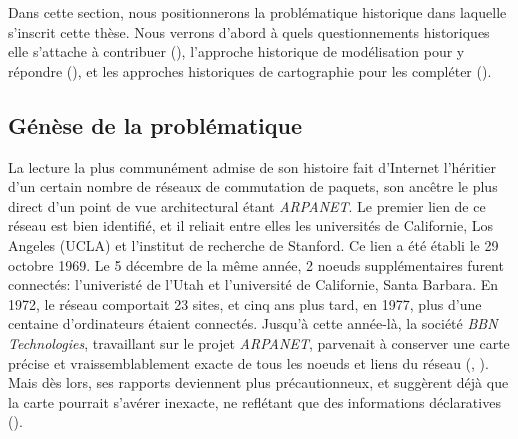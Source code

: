 Dans cette section, nous positionnerons la problématique historique dans
laquelle s'inscrit cette thèse. Nous verrons d'abord à quels questionnements
historiques elle s'attache à contribuer (), l'approche
historique de modélisation pour y répondre (), et les
approches historiques de cartographie pour les compléter
().

\subsection{Génèse de la problématique}
\label{subsec:intro-genesis}

La lecture la plus communément admise de son histoire fait d'Internet l'héritier
d'un certain nombre de réseaux de commutation de paquets, son ancêtre le plus
direct d'un point de vue architectural étant {\em ARPANET}. Le premier lien de
ce réseau est bien identifié, et il reliait entre elles les universités de
Californie, Los Angeles (UCLA) et l'institut de recherche de Stanford. Ce lien a
été établi le 29 octobre 1969. Le 5 décembre de la même année, 2 noeuds
supplémentaires furent connectés: l'univeristé de l'Utah et l'université de
Californie, Santa Barbara. En 1972, le réseau comportait 23 sites, et cinq ans
plus tard, en 1977, plus d'une centaine d'ordinateurs étaient connectés.
Jusqu'à cette année-là, la société {\em BBN Technologies}, travaillant sur le
projet {\em ARPANET}, parvenait à conserver une carte précise et
vraissemblablement exacte de tous les noeuds et liens du réseau
(, \cite{bbn-report}).
Mais dès lors, ses rapports deviennent plus précautionneux, et suggèrent déjà
que la carte pourrait s'avérer inexacte, ne reflétant que des informations
déclaratives ().

